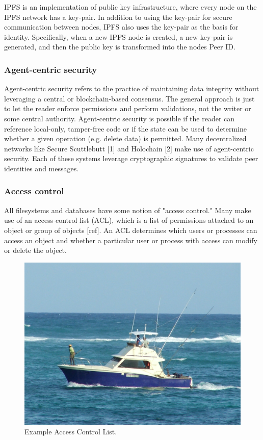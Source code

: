 \documentclass{comjnl}
\begin{document}
IPFS is an implementation of public key infrastructure, where every node on the IPFS network has a key-pair. In addition to using the key-pair for secure communication between nodes, IPFS also uses the key-pair as the basis for identity. Specifically, when a new IPFS node is created, a new key-pair is generated, and then the public key is transformed into the nodes Peer ID. 

\subsubsection{Agent-centric security}

Agent-centric security refers to the practice of maintaining data integrity without leveraging a central or blockchain-based consensus. The general approach is just to let the reader enforce permissions and perform validations, not the writer or some central authority. Agent-centric security is possible if the reader can reference local-only, tamper-free code or if the state can be used to determine whether a given operation (e.g. delete data) is permitted. Many decentralized networks like Secure Scuttlebutt [1] and Holochain [2] make use of agent-centric security. Each of these systems leverage cryptographic signatures to validate peer identities and messages.


\subsubsection{Access control}

All filesystems and databases have some notion of "access control." Many make use of an access-control list (ACL), which is a list of permissions attached to an object or group of objects [ref]. An ACL determines which users or processes can access an object and whether a particular user or process with access can modify or delete the object. 

\begin{figure}
  \includegraphics[width=\linewidth]{boat.jpg}
  \caption{Example Access Control List.}
  \label{fig:boat1}
\end{figure}
\end{document}

